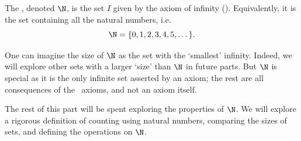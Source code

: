 \begin{definition}
    The , denoted $\N$, is the set $I$ given by the axiom of infinity (). Equivalently, it is the set containing all the natural numbers, i.e.
    \[
        \N = \{0, 1, 2, 3, 4, 5, \dots\}.
    \]
\end{definition}

One can imagine the size of $\N$ as the set with the `smallest' infinity. Indeed, we will explore other sets with a larger `size' than $\N$ in future parts. But $\N$ is special as it is the only infinite set asserted by an axiom; the rest are all consequences of the \ZFC~axioms, and not an axiom itself.

The rest of this part will be spent exploring the properties of $\N$. We will explore a rigorous definition of counting using natural numbers, comparing the sizes of sets, and defining the operations on $\N$.
